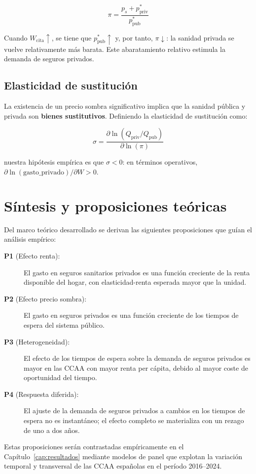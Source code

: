 \begin{equation}
  \pi = \frac{p_s + p_{\text{priv}}^{*}}{p_{\text{pub}}^{*}}
  \label{eq:precio_relativo}
\end{equation}

Cuando $W_{\text{cita}} \uparrow$, se tiene que $p_{\text{pub}}^{*} \uparrow$ y,
por tanto, $\pi \downarrow$: la sanidad privada se vuelve relativamente más barata.
Este abaratamiento relativo estimula la demanda de seguros privados.

\subsection{Elasticidad de sustitución}

La existencia de un precio sombra significativo implica que la sanidad pública y
privada son \textbf{bienes sustitutivos}. Definiendo la elasticidad de sustitución
como:

\begin{equation}
  \sigma = \frac{\partial \ln(Q_{\text{priv}}/Q_{\text{pub}})}
                {\partial \ln(\pi)}
  \label{eq:elasticidad_sustitucion}
\end{equation}

nuestra hipótesis empírica es que $\sigma < 0$: en términos operativos,
$\partial \ln(\text{gasto\_privado}) / \partial W > 0$.

\section{Síntesis y proposiciones teóricas}

Del marco teórico desarrollado se derivan las siguientes proposiciones que guían
el análisis empírico:

\begin{description}
  \item[\textbf{P1} (Efecto renta):] El gasto en seguros sanitarios privados es
    una función creciente de la renta disponible del hogar, con elasticidad-renta
    esperada mayor que la unidad.

  \item[\textbf{P2} (Efecto precio sombra):] El gasto en seguros privados es una
    función creciente de los tiempos de espera del sistema público.

  \item[\textbf{P3} (Heterogeneidad):] El efecto de los tiempos de espera sobre
    la demanda de seguros privados es mayor en las CCAA con mayor renta per cápita,
    debido al mayor coste de oportunidad del tiempo.

  \item[\textbf{P4} (Respuesta diferida):] El ajuste de la demanda de seguros
    privados a cambios en los tiempos de espera no es instantáneo; el efecto
    completo se materializa con un rezago de uno a dos años.
\end{description}

Estas proposiciones serán contrastadas empíricamente en el
Capítulo~\ref{cap:resultados} mediante modelos de panel que explotan la variación
temporal y transversal de las CCAA españolas en el período 2016--2024.
